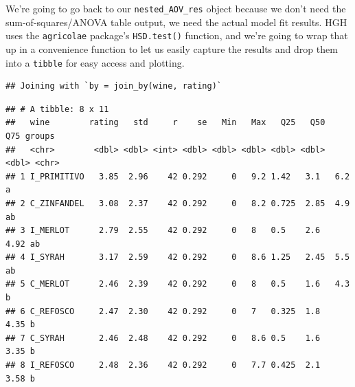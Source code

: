\documentclass[
]{book}
\newenvironment{Shaded}{\begin{snugshade}}{\end{snugshade}}
\newcommand{\AttributeTok}[1]{\textcolor[rgb]{0.13,0.29,0.53}{#1}}
\newcommand{\CommentTok}[1]{\textcolor[rgb]{0.56,0.35,0.01}{\textit{#1}}}
\newcommand{\ControlFlowTok}[1]{\textcolor[rgb]{0.13,0.29,0.53}{\textbf{#1}}}
\newcommand{\DecValTok}[1]{\textcolor[rgb]{0.00,0.00,0.81}{#1}}
\newcommand{\FunctionTok}[1]{\textcolor[rgb]{0.13,0.29,0.53}{\textbf{#1}}}
\newcommand{\NormalTok}[1]{#1}
\newcommand{\OtherTok}[1]{\textcolor[rgb]{0.56,0.35,0.01}{#1}}
\newcommand{\SpecialCharTok}[1]{\textcolor[rgb]{0.81,0.36,0.00}{\textbf{#1}}}
\newcommand{\StringTok}[1]{\textcolor[rgb]{0.31,0.60,0.02}{#1}}
\begin{document}
We're going to go back to our \texttt{nested\_AOV\_res} object because we don't need the sum-of-squares/ANOVA table output, we need the actual model fit results. HGH uses the \texttt{agricolae} package's \texttt{HSD.test()} function, and we're going to wrap that up in a convenience function to let us easily capture the results and drop them into a \texttt{tibble} for easy access and plotting.

\begin{Shaded}
\end{Shaded}

\begin{verbatim}
## Joining with `by = join_by(wine, rating)`
\end{verbatim}

\begin{verbatim}
## # A tibble: 8 x 11
##   wine        rating   std     r    se   Min   Max   Q25   Q50   Q75 groups
##   <chr>        <dbl> <dbl> <int> <dbl> <dbl> <dbl> <dbl> <dbl> <dbl> <chr> 
## 1 I_PRIMITIVO   3.85  2.96    42 0.292     0   9.2 1.42   3.1   6.2  a     
## 2 C_ZINFANDEL   3.08  2.37    42 0.292     0   8.2 0.725  2.85  4.9  ab    
## 3 I_MERLOT      2.79  2.55    42 0.292     0   8   0.5    2.6   4.92 ab    
## 4 I_SYRAH       3.17  2.59    42 0.292     0   8.6 1.25   2.45  5.5  ab    
## 5 C_MERLOT      2.46  2.39    42 0.292     0   8   0.5    1.6   4.3  b     
## 6 C_REFOSCO     2.47  2.30    42 0.292     0   7   0.325  1.8   4.35 b     
## 7 C_SYRAH       2.46  2.48    42 0.292     0   8.6 0.5    1.6   3.35 b     
## 8 I_REFOSCO     2.48  2.36    42 0.292     0   7.7 0.425  2.1   3.58 b
\end{verbatim}
\end{document}
